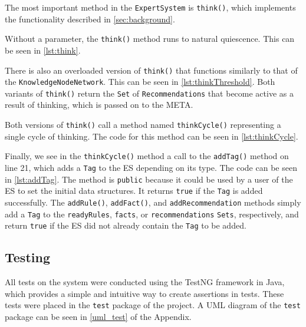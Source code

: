 \documentclass[titlepage,11pt]{article}
\def \espath {"C:/Users/Sean/IdeaProjects/Prometheus/src/es/ExpertSystem.java"}
\newcommand{\ar}[1]{\autoref{#1}}
\newcommand{\code}[1]{\texttt{#1}}
\begin{document}
The most important method in the \code{ExpertSystem} is \code{think()}, which implements the functionality described in \ar{sec:background}.

Without a parameter, the \code{think()} method runs to natural quiescence. This can be seen in \autoref{lst:think}.



There is also an overloaded version of \code{think()} that functions similarly to that of the \code{KnowledgeNodeNetwork}. This can be seen in \autoref{lst:thinkThreshold}. Both variants of \code{think()} return the \code{Set} of \code{Recommendations} that become active as a result of thinking, which is passed on to the META.



Both versions of \code{think()} call a method named \code{thinkCycle()} representing a single cycle of thinking. The code for this method can be seen in \autoref{lst:thinkCycle}.



Finally, we see in the \code{thinkCycle()} method a call to the \code{addTag()} method on line 21, which adds a \code{Tag} to the ES depending on its type. The code can be seen in \autoref{lst:addTag}. The method is \code{public} because it could be used by a user of the ES to set the initial data structures. It returns \code{true} if the \code{Tag} is added successfully. The \code{addRule()}, \code{addFact()}, and \code{addRecommendation} methods simply add a \code{Tag} to the \code{readyRules}, \code{facts}, or \code{recommendations} \code{Sets}, respectively, and return \code{true} if the ES did not already contain the \code{Tag} to be added.



\subsection{Testing}

All tests on the system were conducted using the TestNG framework in Java, which provides a simple and intuitive way to create assertions in tests. These tests were placed in the \code{test} package of the project. A UML diagram of the \code{test} package can be seen in \autoref{uml_test} of the Appendix.
\end{document}
